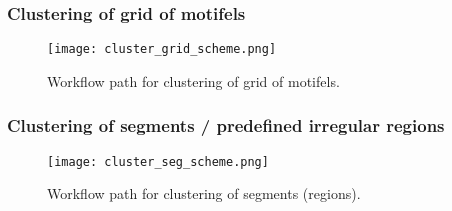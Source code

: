 \FloatBarrier

\subsubsection{Clustering of grid of motifels}

\begin{figure}[H]
	\centering
	\texttt{[image: cluster\_grid\_scheme.png]}
	\caption{Workflow path for clustering of grid of motifels.}
	\label{FIG:CLUSTER_GRID}
\end{figure}

\FloatBarrier

\subsubsection{Clustering of segments / predefined irregular regions}

\begin{figure}[H]
	\centering
	\texttt{[image: cluster\_seg\_scheme.png]}
	\caption{Workflow path for clustering of segments (regions).}
	\label{FIG:CLUSTER_SEGMENT}
\end{figure}